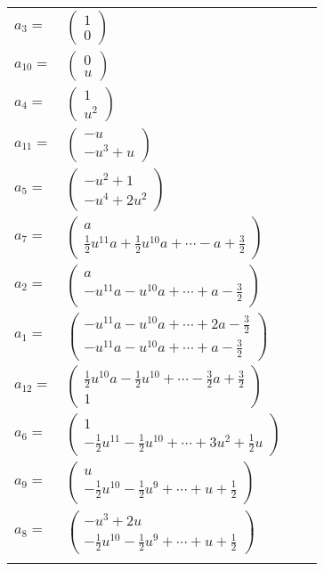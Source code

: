 \documentclass[1p]{elsarticle_modified}
\theoremstyle{definition}
\begin{document}
\begin{tabular}{m{7pt} m{180pt} m{7pt} m{180pt} }
\flushright $a_{3}=$&$\begin{pmatrix}1\\0\end{pmatrix}$ \\
\flushright $a_{10}=$&$\begin{pmatrix}0\\u\end{pmatrix}$ \\
\flushright $a_{4}=$&$\begin{pmatrix}1\\u^2\end{pmatrix}$ \\
\flushright $a_{11}=$&$\begin{pmatrix}- u\\- u^3+u\end{pmatrix}$ \\
\flushright $a_{5}=$&$\begin{pmatrix}- u^2+1\\- u^4+2 u^2\end{pmatrix}$ \\
\flushright $a_{7}=$&$\begin{pmatrix}a\\\frac{1}{2} u^{11} a+\frac{1}{2} u^{10} a+\cdots- a+\frac{3}{2}\end{pmatrix}$ \\
\flushright $a_{2}=$&$\begin{pmatrix}a\\- u^{11} a- u^{10} a+\cdots+a-\frac{3}{2}\end{pmatrix}$ \\
\flushright $a_{1}=$&$\begin{pmatrix}- u^{11} a- u^{10} a+\cdots+2 a-\frac{3}{2}\\- u^{11} a- u^{10} a+\cdots+a-\frac{3}{2}\end{pmatrix}$ \\
\flushright $a_{12}=$&$\begin{pmatrix}\frac{1}{2} u^{10} a-\frac{1}{2} u^{10}+\cdots-\frac{3}{2} a+\frac{3}{2}\\1\end{pmatrix}$ \\
\flushright $a_{6}=$&$\begin{pmatrix}1\\-\frac{1}{2} u^{11}-\frac{1}{2} u^{10}+\cdots+3 u^2+\frac{1}{2} u\end{pmatrix}$ \\
\flushright $a_{9}=$&$\begin{pmatrix}u\\-\frac{1}{2} u^{10}-\frac{1}{2} u^9+\cdots+u+\frac{1}{2}\end{pmatrix}$ \\
\flushright $a_{8}=$&$\begin{pmatrix}- u^3+2 u\\-\frac{1}{2} u^{10}-\frac{1}{2} u^9+\cdots+u+\frac{1}{2}\end{pmatrix}$\\&\end{tabular}
\end{document}
